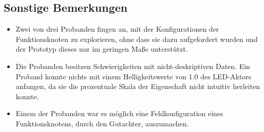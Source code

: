 \subsection*{Sonstige Bemerkungen} 
\begin{itemize}
    \item Zwei von drei Probanden fingen an, mit der Konfigurationen der Funktionsknoten zu explorieren, ohne dass sie dazu aufgefordert wurden und der Prototyp dieses nur im geringen Maße unterstützt.
    \item Die Probanden besitzen Schwierigkeiten mit nicht-deskriptiven Daten. Ein Proband konnte nichts mit einem Helligkeitswerte von 1.0 des LED-Aktors anfangen, da sie die prozentuale Skala der Eigenschaft nicht intuitiv herleiten konnte.
    \item Einem der Probanden war es möglich eine Fehlkonfiguration eines Funktionsknotens, durch den Gutachter, auszumachen.
\end{itemize}
